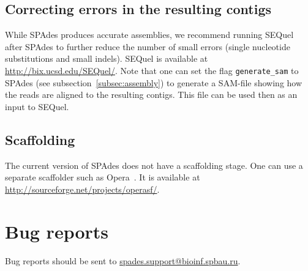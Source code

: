\documentclass{article}
\def\spades{SPAdes}
\begin{document}
\subsection{Correcting errors in the resulting contigs}
While {\spades} produces accurate assemblies, 
we recommend running SEQuel~\cite{sequel} after {\spades} to further reduce the number of small errors (single nucleotide substitutions and small indels). SEQuel is available at
\url{http://bix.ucsd.edu/SEQuel/}. Note that one can set the flag {\tt generate\_sam} to {\spades}
(see subsection~\ref{subsec:assembly}) to generate a SAM-file showing how the 
reads are aligned to the resulting contigs.
This file can be used then as an input to SEQuel.


\subsection{Scaffolding}
The current version of {\spades} does not have a scaffolding stage.
One can use a separate scaffolder such as Opera~\cite{opera}.
It is available at \url{http://sourceforge.net/projects/operasf/}.

\section{Bug reports}
Bug reports should be sent to \url{spades.support@bioinf.spbau.ru}.




\end{document}
